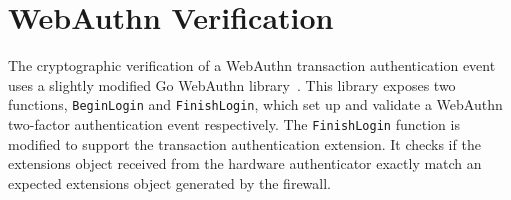 




\section{WebAuthn Verification}\label{Sec:WebauthnVerification}

The cryptographic verification of a WebAuthn transaction authentication event uses a slightly modified Go WebAuthn library~\cite{webauthn-library}. This library exposes two functions, \lstinline{BeginLogin} and \lstinline{FinishLogin}, which set up and validate a WebAuthn two-factor authentication event respectively. The \lstinline{FinishLogin} function is modified to support the transaction authentication extension. It checks if the extensions object received from the hardware authenticator exactly match an expected extensions object generated by the firewall.



